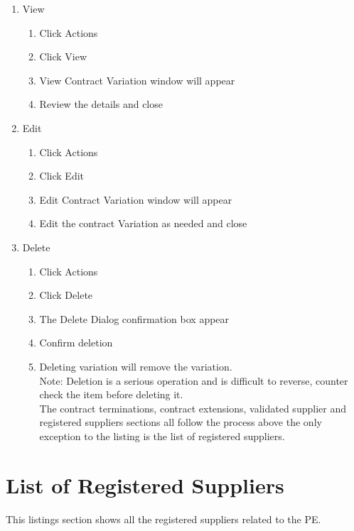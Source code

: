 \documentclass [12pt]{book}
\begin{document}
\begin{enumerate}
\begin{enumerate}
\begin{enumerate}
\item View
    \begin{enumerate}
      
      \item Click Actions 
      \item Click View
      \item View Contract Variation window will appear
      \item Review the details and close   
        
    \end{enumerate}

\item Edit
    \begin{enumerate}
    
     \item Click Actions 
     \item Click Edit
     \item Edit Contract Variation window will appear
     \item Edit the contract Variation as needed and close
        
    \end{enumerate}

\item Delete
    \begin{enumerate}
    
     \item Click Actions 
     \item Click Delete
     \item The Delete Dialog confirmation box appear
     \item Confirm deletion
     \item Deleting variation will remove the variation.\\
     Note: Deletion is a serious operation and is difficult to reverse, counter check the item before deleting it.\\
    
     The contract terminations, contract extensions, validated supplier and registered suppliers sections all follow the process above the only exception to the listing is the list of registered suppliers.
    
    \end{enumerate}

\end{enumerate}


\section{List of Registered Suppliers}
This listings section shows all the registered suppliers related to the PE.


\end{enumerate}
\end{enumerate}
\end{document}
